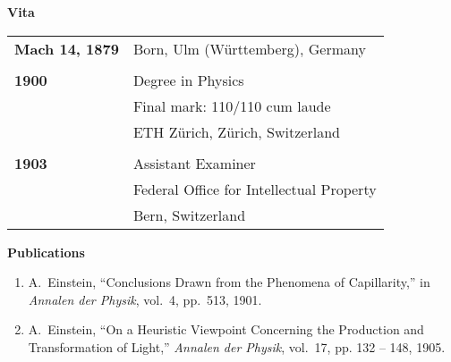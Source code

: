 \begin{center}
\vspace*{0.5cm}
{\Large \bf  Vita}
\end{center}
\begin{table}[h!]
\begin{center}
\renewcommand{\arraystretch}{1.25}
\begin{tabular*}{1\textwidth}{l p{8.5cm}}

{\bf Mach 14, 1879} & Born, Ulm (W\"urttemberg), Germany \\
& \\
{\bf 1900} & Degree in Physics\\
& Final mark: 110/110 cum laude\\
& ETH Z\"urich, Z\"urich, Switzerland \\
& \\
{\bf 1903} & Assistant Examiner\\
& Federal Office for Intellectual Property\\
& Bern, Switzerland \\

\end{tabular*}
\end{center}
\end{table}
\clearpage
\begin{center}
\vspace*{0.5cm}
{\Large \bf  Publications}
\end{center}
\vspace*{0.5cm}
{\small
\begin{enumerate}


\item A.~Einstein, ``Conclusions Drawn from the Phenomena of Capillarity,'' in \emph{Annalen der Physik}, vol.~4, pp.~513, 1901.

\item A.~Einstein, ``On a Heuristic Viewpoint Concerning the Production and Transformation of Light,'' \emph{Annalen der Physik}, vol.~17, pp. 132 -- 148, 1905.

\end{enumerate}
}

